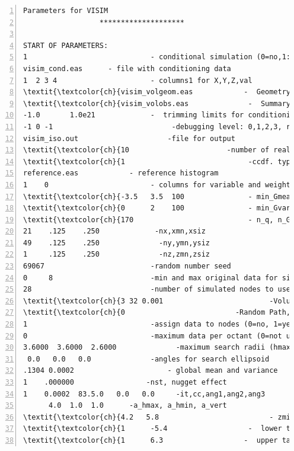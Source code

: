\documentclass[12t]{article}
\begin{document}
\clearpage
\begin{table}
\scriptsize
\begin{Verbatim}[fontfamily=tt,numbers=left,commandchars=\\\{\}]
                  Parameters for VISIM
                  ********************

START OF PARAMETERS:
1                             - conditional simulation (0=no,1:(p,v), 2:(p), 3:(v)
visim_cond.eas      - file with conditioning data
1  2 3 4                      - columns1 for X,Y,Z,val
\textit{\textcolor{ch}{visim_volgeom.eas            -  Geometry of volume/ray}}
\textit{\textcolor{ch}{visim_volobs.eas              -  Summary of volgeom.eas.}}
-1.0       1.0e21             -  trimming limits for conditioning data
-1 0 -1                            -debugging level: 0,1,2,3, read\_covtab [1=from disk], read\_lambda
visim_iso.out                     -file for output
\textit{\textcolor{ch}{10                       -number of realizations to generate}}
\textit{\textcolor{ch}{1                             -ccdf. type: 0-Gaussian, 1-Dssim-histogram reproduction}}
reference.eas            - reference histogram
1    0                        - columns for variable and weights
\textit{\textcolor{ch}{-3.5   3.5  100               - min_Gmean, max_Gmean, n_Gmean}}
\textit{\textcolor{ch}{0      2    100               - min_Gvar, max_Gvar, n_Gvar}}
\textit{\textcolor{ch}{170                           - n_q, n_Gsim}}
21    .125    .250             -nx,xmn,xsiz
49    .125    .250              -ny,ymn,ysiz
1     .125    .250              -nz,zmn,zsiz
69067                         -random number seed
0     8                       -min and max original data for sim
28                            -number of simulated nodes to use
\textit{\textcolor{ch}{3 32 0.001                         -Volume Neighborhood, method[0,1,2] , nusevols, accept_frac}}
\textit{\textcolor{ch}{0                          -Random Path, [1] independent, [2] rays first, [3] preferential}}
1                             -assign data to nodes (0=no, 1=yes)
0                             -maximum data per octant (0=not used)
3.6000  3.6000  2.6000              -maximum search radii (hmax,hmin,vert)
 0.0   0.0   0.0              -angles for search ellipsoid
.1304 0.0002                      - global mean and variance
1    .000000                 -nst, nugget effect
1    0.0002  83.5.0   0.0   0.0     -it,cc,ang1,ang2,ang3
      4.0  1.0  1.0      -a_hmax, a_hmin, a_vert
\textit{\textcolor{ch}{4.2   5.8                          - zmin,zmax (tail extrapolation for target histogram)}}
\textit{\textcolor{ch}{1      -5.4                   -  lower tail option, parameter}}
\textit{\textcolor{ch}{1      6.3                   -  upper tail option, parameter}}
\end{Verbatim}
\caption{Input parameter file for \visimprog.}
\label{tab:par}
\end{table}
\end{document}
